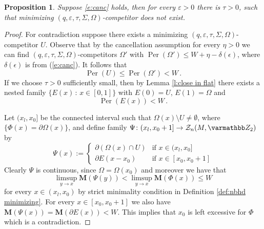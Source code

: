 \documentclass[12pt,twoside]{amsart}
\numberwithin{equation}{section}
\renewcommand{\leq}{\leqslant}
\renewcommand{\mathbb}{\varmathbb}
\newtheorem{proposition}[theorem]{Proposition}
\newtheorem{definition}[theorem]{Definition}
\newcommand{\cF}{\mathcal F}
\renewcommand{\cH}{\mathcal H}
\newcommand{\bM}{\mathbf{M}}
\DeclareMathOperator{\Per}{Per}
\newcommand{\eps}{\varepsilon}
\begin{document}
\begin{proposition} \label{thm:no_competitor}
    Suppose \eqref{e:canc} holds, then 
    for every $\eps>0$ there is $\tau>0$,
    such that 
    minimizing $(q,\eps, \tau, \Sigma, \Omega)$-competitor
    does not exist.
\end{proposition}

\begin{proof} 
For contradiction suppose 
there exists a minimizing $(q,\eps, \tau, \Sigma, \Omega)$-competitor
$U$. Observe that by the cancellation
assumption for every $\eta>0$ 
we can find $(q,\eps, \tau, \Sigma, \Omega)$-competitors 
$\Omega'$
with $\Per(\Omega') \leq W+ \eta - \delta(\epsilon)$,
where $\delta(\epsilon)$ is from (\ref{e:canc}). 
It follows that 
$$\Per(U) \leq \Per(\Omega')<W \, .$$
If we choose $\tau>0$ sufficiently small,
then by Lemma \ref{l:close in flat}
there exists a nested family $\{E(x)\,:\,x\in [0,1]\}$
with $E(0)= U$, $E(1) = \Omega$ and
$$\Per(E(x))< W \, .$$

Let $(x_l,x_0]$ be the connected interval such that $\Omega(x)\setminus U\neq \emptyset$, where $\{\Phi(x)=\partial \Omega(x)\}$, and define 
family $\Psi \colon (x_l, x_0+1] \to \mathcal Z_n(M, \mathbb Z_2)$ by
$$
\Psi(x):=
\begin{cases}
\partial(\Omega(x)\cap U) & \text{if }x\in (x_l,x_0] \\
\partial  E(x-x_0)
& \text{if }x\in [x_0, x_0+1]
\end{cases}
$$
Clearly $\Psi$ is continuous, since $\Omega=\Omega(x_0)$ and moreover we have that
$$
\limsup_{y\to x} \bM(\Psi(y)) < \limsup_{y\to x} \bM(\Phi(x)) \leq W
$$
for every $x\in (x_l,x_0)$ by
strict minimality condition in Definition \ref{def:nbhd minimizing}. For every $x\in [x_0, x_0+1]$
we also have $\bM(\Psi(x)) = \bM(\partial E(x))<W$. This implies that $x_0$ is left excessive for $\Phi$ which is a contradiction.
\end{proof}


 



\end{document}
